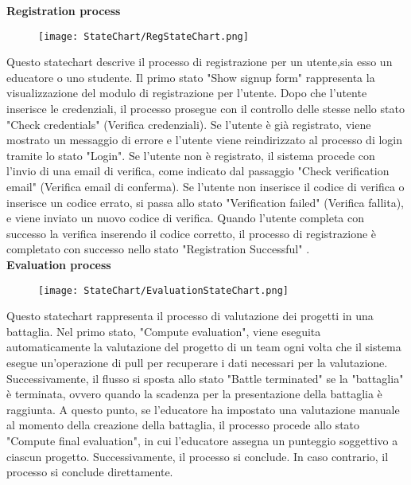 \newpage
\noindent\textbf{Registration process}
    \begin{figure}[H]
  \texttt{[image: StateChart/RegStateChart.png]} 
  \label{fig:immagine}
\end{figure}
\noindent Questo statechart descrive il processo di registrazione per un utente,sia esso un educatore o uno studente.
Il primo stato "Show signup form"  rappresenta la visualizzazione del modulo di registrazione per l'utente.
Dopo che l'utente inserisce le credenziali, il processo prosegue con il controllo delle stesse nello stato "Check credentials" (Verifica credenziali). Se l'utente è già registrato, viene mostrato un messaggio di errore e l'utente viene reindirizzato al processo di login tramite lo stato "Login". Se l'utente non è registrato, il sistema procede con l'invio di una email di verifica, come indicato dal passaggio "Check verification email" (Verifica email di conferma). Se l'utente non inserisce il codice di verifica o inserisce un codice errato, si passa allo stato "Verification failed" (Verifica fallita), e viene inviato un nuovo codice di verifica.
Quando l'utente completa con successo la verifica inserendo il codice corretto, il processo di registrazione è completato con successo nello stato "Registration Successful" .
\\
\noindent\textbf{Evaluation process}
    \begin{figure}[H]
  \texttt{[image: StateChart/EvaluationStateChart.png]} 
  \label{fig:immagine}
\end{figure}
\noindent Questo statechart rappresenta il processo di valutazione dei progetti in una battaglia. Nel primo stato, "Compute evaluation", viene eseguita automaticamente la valutazione del progetto di un team ogni volta che il sistema esegue un'operazione di pull per recuperare i dati necessari per la valutazione. Successivamente, il flusso si sposta allo stato "Battle terminated" se la "battaglia" è terminata, ovvero quando la scadenza per la presentazione della battaglia è raggiunta. A questo punto, se l'educatore ha impostato una valutazione manuale al momento della creazione della battaglia, il processo procede allo stato "Compute final evaluation", in cui l'educatore assegna un punteggio soggettivo a ciascun progetto. Successivamente, il processo si conclude. In caso contrario, il processo si conclude direttamente.\\

